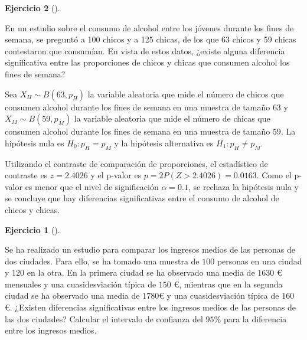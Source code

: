 \documentclass[
  a4paper,
]{scrreport}
\theoremstyle{definition}
\newtheorem{exercise}{Ejercicio}[chapter]
\theoremstyle{remark}
\begin{document}
\begin{exercise}[]\protect\hypertarget{exr-contraste-proporcion-consumo-alcohol}{}\label{exr-contraste-proporcion-consumo-alcohol}

En un estudio sobre el consumo de alcohol entre los jóvenes durante los
fines de semana, se preguntó a 100 chicos y a 125 chicas, de los que 63
chicos y 59 chicas contestaron que consumían. En vista de estos datos,
¿existe alguna diferencia significativa entre las proporciones de chicos
y chicas que consumen alcohol los fines de semana?

\begin{tcolorbox}[enhanced jigsaw, leftrule=.75mm, colbacktitle=quarto-callout-tip-color!10!white, opacityback=0, colback=white, toprule=.15mm, colframe=quarto-callout-tip-color-frame, coltitle=black, left=2mm, title=\textcolor{quarto-callout-tip-color}{\faLightbulb}\hspace{0.5em}{Solución}, breakable, bottomtitle=1mm, bottomrule=.15mm, opacitybacktitle=0.6, toptitle=1mm, arc=.35mm, titlerule=0mm, rightrule=.15mm]

Sea \(X_H\sim B(63,p_H)\) la variable aleatoria que mide el número de
chicos que consumen alcohol durante los fines de semana en una muestra
de tamaño \(63\) y \(X_M\sim B(59,p_M)\) la variable aleatoria que mide
el número de chicas que consumen alcohol durante los fines de semana en
una muestra de tamaño \(59\). La hipótesis nula es \(H_0: p_H=p_M\) y la
hipótesis alternativa es \(H_1: p_H\neq p_M\).

Utilizando el contraste de comparación de proporciones, el estadístico
de contraste es \(z=2.4026\) y el p-valor es
\(p =2 P(Z>2.4026) = 0.0163\). Como el p-valor es menor que el nivel de
significación \(\alpha = 0.1\), se rechaza la hipótesis nula y se
concluye que hay diferencias significativas entre el consumo de alcohol
de chicos y chicas.

\end{tcolorbox}

\begin{exercise}[]\protect\hypertarget{exr-contraste-medias-ingresos}{}\label{exr-contraste-medias-ingresos}

Se ha realizado un estudio para comparar los ingresos medios de las
personas de dos ciudades. Para ello, se ha tomado una muestra de \(100\)
personas en una ciudad y \(120\) en la otra. En la primera ciudad se ha
observado una media de \(1630\) € mensuales y una cuasidesviación típica
de \(150\) €, mientras que en la segunda ciudad se ha observado una
media de \(1780\)€ y una cuasidesviación típica de \(160\) €. ¿Existen
diferencias significativas entre los ingresos medios de las personas de
las dos ciudades? Calcular el intervalo de confianza del \(95\)\% para
la diferencia entre los ingresos medios.


\end{exercise}
\end{exercise}
\end{document}

